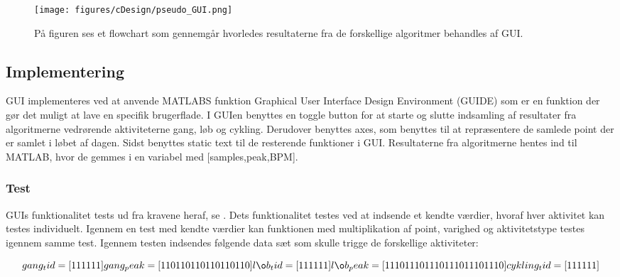 \begin{figure}[H]
	\centering
	\texttt{[image: figures/cDesign/pseudo\_GUI.png]}
	\caption{På figuren ses et flowchart som gennemgår hvorledes resultaterne fra de forskellige algoritmer behandles af GUI.}
	\label{fig:GUI}
\end{figure}

\subsection{Implementering}
GUI implementeres ved at anvende MATLABS funktion Graphical User Interface Design Environment (GUIDE) som er en funktion der gør det muligt at lave en specifik brugerflade. I GUIen benyttes en toggle button for at starte og slutte indsamling af resultater fra algoritmerne vedrørende aktiviteterne gang, løb og cykling. Derudover benyttes axes, som benyttes til at repræsentere de samlede point der er samlet i løbet af dagen. Sidst benyttes static text til de resterende funktioner i GUI. \newline
Resultaterne fra algoritmerne hentes ind til MATLAB, hvor de gemmes i en variabel med [samples,peak,BPM].

\subsubsection{Test}
GUIs funktionalitet tests ud fra kravene heraf, se . Dets funktionalitet testes ved at indsende et kendte værdier, hvoraf hver aktivitet kan testes individuelt. Igennem en test med kendte værdier kan funktionen med multiplikation af point, varighed og aktivitetstype testes igennem samme test. Igennem testen indsendes følgende data sæt som skulle trigge de forskellige aktiviteter: 

\begin{equation}
gang_tid = [1 1 1 1 1 1] \\
gang_peak = [110 110 110 110 110 110] \\
løb_tid = [1 1 1 1 1 1] \\
løb_peak = [1110 1110 1110 1110 1110 1110] \\
cykling_tid = [1 1 1 1 1 1] \\
\end{equation} 


